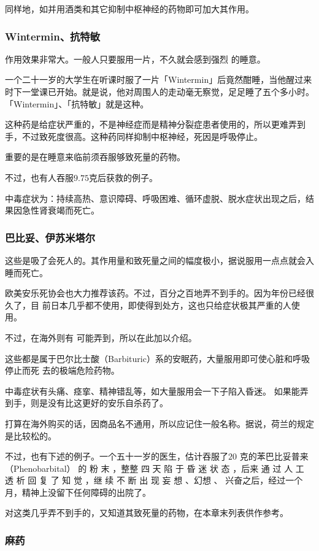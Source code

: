 \documentclass[UTF8]{ctexart}
\begin{document}
同样地，如并用酒类和其它抑制中枢神经的药物即可加大其作用。

\subsubsection{Wintermin、抗特敏}

作用效果非常大。一般人只要服用一片，不久就会感到强烈 的睡意。

一个二十一岁的大学生在听课时服了一片「Wintermin」后竟然酣睡，当他醒过来 时下一堂课已开始。就是说，他对周围人的走动毫无察觉，足足睡了五个多小时。 「Wintermin」、「抗特敏」就是这种。

这种药是给症状严重的，不是神经症而是精神分裂症患者使用的，所以更难弄到手，不过致死度很高。这种药同样抑制中枢神经，死因是呼吸停止。

重要的是在睡意来临前须吞服够致死量的药物。

不过，也有人吞服$9.75$克后获救的例子。

中毒症状为：持续高热、意识障碍、呼吸困难、循环虚脱、脱水症状出现之后，结果因急性肾衰竭而死亡。

\subsubsection{巴比妥、伊苏米塔尔}

这些是吸了会死人的。其作用量和致死量之间的幅度极小，据说服用一点点就会入睡而死亡。

欧美安乐死协会也大力推荐该药。不过，百分之百地弄不到手的。因为年份已经很久了，目
前日本几乎都不使用，即使得到处方，这也只给症状极其严重的人使用。

不过，在海外则有 可能弄到，所以在此加以介绍。

这些都是属于巴尔比士酸（Barbituric）系的安眠药，大量服用即可使心脏和呼吸停止而死 去的极端危险药物。

中毒症状有头痛、痉挛、精神错乱等，如大量服用会一下子陷入昏迷。 如果能弄到手，则是没有比这更好的安乐自杀药了。

打算在海外购买的话，因商品名不通用，所以应记住一般名称。据说，荷兰的规定是比较松的。

不过，也有下述的例子。一个五十一岁的医生，估计吞服了$20$ 克的苯巴比妥普来（Phenobarbital）
的 粉 末 ，整整 四 天 陷 于 昏 迷 状 态 ，后来 通 过 人 工 透 析 回 复 了 知 觉 ，继 续 不 断 出 现 妄 想 、幻想 、 兴奋之后，经过一个月，精神上没留下任何障碍的出院了。

对这类几乎弄不到手的，又知道其致死量的药物，在本章末列表供作参考。

\subsubsection{麻药}
\end{document}
